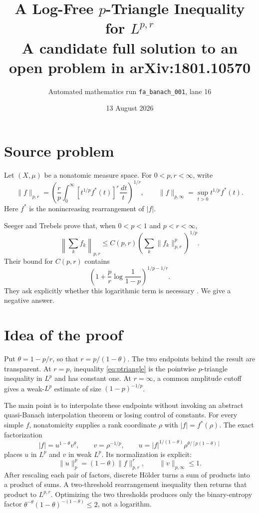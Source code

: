\documentclass[11pt]{article}
\title{A Log-Free $p$-Triangle Inequality for $L^{p,r}$\\
\large A candidate full solution to an open problem in arXiv:1801.10570}
\author{Automated mathematics run \texttt{fa\_banach\_001}, lane 16}
\date{13 August 2026}
\newcommand{\1}{\mathbf 1}
\newcommand{\dd}{\,d}
\begin{document}
\maketitle

\begin{center}
\end{center}

\section{Source problem}

Let $(X,\mu)$ be a nonatomic measure space.  For $0<p,r<\infty$, write
\begin{equation}\label{eq:lorentz}
 \|f\|_{p,r}
 =\left(\frac rp\int_0^\infty
       [t^{1/p}f^*(t)]^r\frac{\dd t}{t}\right)^{1/r},
 \qquad
 \|f\|_{p,\infty}=\sup_{t>0}t^{1/p}f^*(t).
\end{equation}
Here $f^*$ is the nonincreasing rearrangement of $|f|$.

Seeger and Trebels prove that, when $0<p<1$ and $p<r<\infty$,
\begin{equation}\label{eq:ptriangle}
 \left\|\sum_k f_k\right\|_{p,r}
 \le C(p,r)\left(\sum_k\|f_k\|_{p,r}^p\right)^{1/p}.
\end{equation}
Their bound for $C(p,r)$ contains
\[
 \left(1+\frac pr\log\frac1{1-p}\right)^{1/p-1/r}.
\]
They ask explicitly whether this logarithmic term is necessary
\cite[Open problem after (13), and Appendix B]{ST}.  We give a negative
answer.

\section{Idea of the proof}

Put $\theta=1-p/r$, so that $r=p/(1-\theta)$.  The two endpoints behind
the result are transparent.  At $r=p$, inequality \eqref{eq:ptriangle} is
the pointwise $p$-triangle inequality in $L^p$ and has constant one.  At
$r=\infty$, a common amplitude cutoff gives a weak-$L^p$ estimate of size
$(1-p)^{-1/p}$.

The main point is to interpolate these endpoints without invoking an
abstract quasi-Banach interpolation theorem or losing control of constants.
For every simple $f$, nonatomicity supplies a rank coordinate $\rho$ with
$|f|=f^*(\rho)$.  The exact factorization
\[
 |f|=u^{1-\theta}v^\theta,\qquad
 v=\rho^{-1/p},\qquad
 u=|f|^{1/(1-\theta)}
       \rho^{\theta/[p(1-\theta)]}
\]
places $u$ in $L^p$ and $v$ in weak $L^p$.  Its normalization is explicit:
\[
 \|u\|_p^p=(1-\theta)\|f\|_{p,r}^r,
 \qquad \|v\|_{p,\infty}\le1.
\]
After rescaling each pair of factors, discrete H\"older turns a sum of
products into a product of sums.  A two-threshold rearrangement inequality
then returns that product to $L^{p,r}$.  Optimizing the two thresholds
produces only the binary-entropy factor
$\theta^{-\theta}(1-\theta)^{-(1-\theta)}\le2$, not a logarithm.
\end{document}
